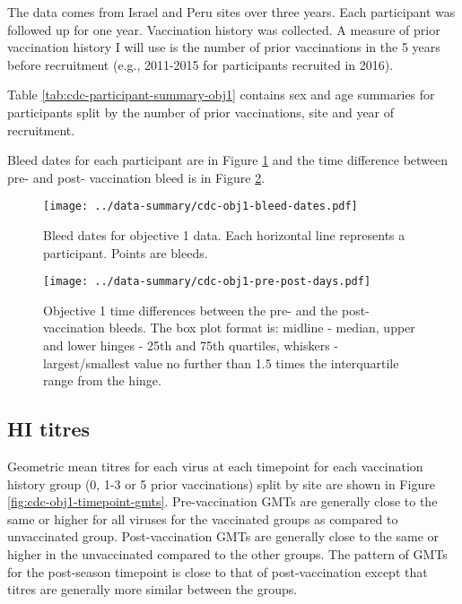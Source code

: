 \documentclass[12pt]{article}
\begin{document}
The data comes from Israel and Peru sites over three years. Each participant was followed up for one year. Vaccination history was collected. A measure of prior vaccination history I will use is the number of prior vaccinations in the 5 years before recruitment (e.g., 2011-2015 for participants recruited in 2016).

Table \ref{tab:cdc-participant-summary-obj1} contains sex and age summaries for participants split by the number of prior vaccinations, site and year of recruitment.



Bleed dates for each participant are in Figure \ref{fig:cdc-obj1-bleed-dates} and the time difference between pre- and post- vaccination bleed is in Figure \ref{fig:cdc-obj1-pre-post-days}.

\begin{figure}
	\texttt{[image: ../data-summary/cdc-obj1-bleed-dates.pdf]}
	\caption{Bleed dates for objective 1 data. Each horizontal line represents a participant. Points are bleeds.}
	\label{fig:cdc-obj1-bleed-dates}
\end{figure}

\begin{figure}
	\texttt{[image: ../data-summary/cdc-obj1-pre-post-days.pdf]}
	\caption{Objective 1 time differences between the pre- and the post-vaccination bleeds. The box plot format is: midline - median, upper and lower hinges - 25th and 75th quartiles, whiskers - largest/smallest value no further than 1.5 times the interquartile range from the hinge.}
	\label{fig:cdc-obj1-pre-post-days}
\end{figure}

\subsection{HI titres}

Geometric mean titres for each virus at each timepoint for each vaccination history group (0, 1-3 or 5 prior vaccinations) split by site are shown in Figure
\ref{fig:cdc-obj1-timepoint-gmts}.
Pre-vaccination GMTs are generally close to the same
or higher for all viruses for the vaccinated groups as compared to unvaccinated group.
Post-vaccination GMTs are generally close to the same or higher in the unvaccinated compared to the other groups. The pattern of GMTs for the post-season timepoint is close to that
of post-vaccination except that titres are generally more similar between the groups.
\end{document}
